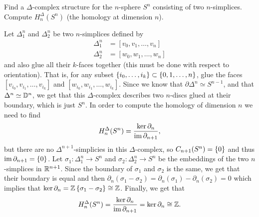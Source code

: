 \documentclass[11pt,a4paper]{article}
\begin{document}
\begin{exercise}
  Find a $\Delta$-complex structure for the $n$-sphere $S^n$
  consisting of two $n$-simplices.
  Compute $H_n^{\Delta}(S^n)$ (the homology at dimension $n$).
\end{exercise}
\begin{solution}
  Let $\Delta^n_1$ and $\Delta^n_2$ be two $n$-simplices
  defined by
  \begin{align*}
    \Delta^n_1 &= [v_0,v_1,\dots,v_n] \\
    \Delta^n_2 &= [w_0,w_1,\dots,w_n]
  \end{align*}
  and also glue all their $k$-faces together (this must be done with respect
  to orientation).
  That is, for any subset $\left\{i_0,\dots,i_k\right\} \subset \left\{0,1,\dots,n\right\}$,
  glue the faces
  $[v_{i_0},v_{i_1},\dots,v_{i_k}]$ and $[w_{i_0},w_{i_1},\dots,w_{i_k}]$.
  Since we know that $\partial \Delta^n \simeq S^{n-1}$,
  and that $\Delta^n \simeq \mathbb{D}^n$, we get that this $\Delta$-complex
  describes two $n$-discs glued at their boundary, which is just $S^n$.
  In order to compute the homology of dimension $n$ we need to find
  \[
    H^{\Delta}_n(S^n) = \frac{\ker \partial_n}{\operatorname{im} \partial_{n+1}},
  \]
  but there are no $\Delta^{n+1}$-simplicies in this $\Delta$-complex,
  so $C_{n+1}(S^n) = \left\{0\right\}$ and thus $\operatorname{im} \partial_{n+1} = \left\{0\right\}$.
  Let $\sigma_1 \colon \Delta^n_1 \to S^n$
  and $\sigma_2 \colon \Delta^n_2 \to S^n$ be the embeddings of the
  two $n$-simplices in $\mathbb{R}^{n+1}$.
  Since the boundary of $\sigma_1$ and $\sigma_2$ is the same,
  we get that their boundary is equal and then
  $\partial_n(\sigma_1 - \sigma_2) =
    \partial_n(\sigma_1) - \partial_n(\sigma_2) = 0$
  which implies that $\ker \partial_n = \mathbb{Z}\left\{\sigma_1 - \sigma_2\right\} \cong \mathbb{Z}$.
  Finally, we get that
  \[
    H^{\Delta}_n(S^n) =
    \frac{\ker \partial_n}{\operatorname{im} \partial_{n+1}} =
    \ker \partial_n \cong \mathbb{Z}.
  \]
\end{solution}
\end{document}
